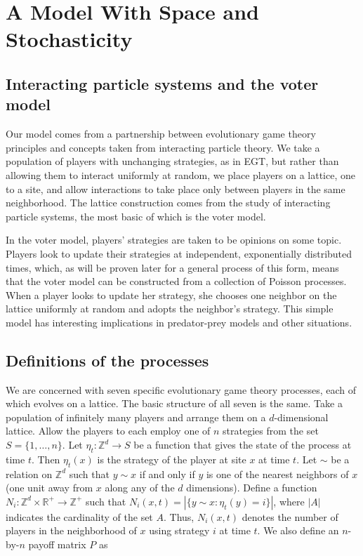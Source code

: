 \documentclass[notitlepage,reqno]{amsart}
\begin{document}
\section{A Model With Space and Stochasticity}
\subsection{Interacting particle systems and the voter model}
\label{sec:votermodel}
Our model comes from a partnership between evolutionary game theory
principles and concepts taken from interacting particle
theory. We take a population of players with unchanging
strategies, as in EGT, but rather than allowing them to interact
uniformly at random, we place players on a lattice, one to a site, and
allow interactions to take place only between players in the same
neighborhood. The lattice construction comes from the study of
interacting particle systems, the most basic of which is the voter model.

In the voter model, players' strategies are taken to be opinions on
some topic. Players look to update their strategies at independent,
exponentially distributed times, which, as will be proven later for
a general process of this form, means
that the voter model can be constructed from a collection of Poisson processes. When a player looks to
update her strategy, she chooses one neighbor on the lattice uniformly
at random and adopts the neighbor's strategy. This simple model has
interesting implications in predator-prey models and other situations.

\subsection{Definitions of the processes}
\label{sec:definitions}
We are concerned with seven specific evolutionary game theory
processes, each of which evolves on a lattice. The basic structure of all seven is the same. Take a population of infinitely
many players and arrange them on a
$d$-dimensional lattice. Allow the players to each employ one of $n$
strategies from the set $S = \{1,\dots,n\}$. Let $\eta_t:\mathbb{Z}^d
\to S$ be a function that gives the state of the process at time $t$. Then
$\eta_t(x)$ is the strategy of the player at site $x$ at time $t$. Let
$\sim$ be a relation on $\mathbb{Z}^d$ such that $y\sim x$ if and only
if $y$ is one of the nearest neighbors of $x$ (one unit away from $x$
along any of the $d$ dimensions). Define a function
$N_i:\mathbb{Z}^d\times \mathbb{R}^+\to \mathbb{Z}^+$ such that
$N_i(x,t) = |\{y\sim x:\eta_t(y) = i\}|$, where $|A|$ indicates the
cardinality of the set $A$. Thus, $N_i(x,t)$ denotes the number of
players in the neighborhood of $x$ using strategy $i$ at time $t$. We
also define an $n$-by-$n$ payoff matrix $P$ as
\end{document}
